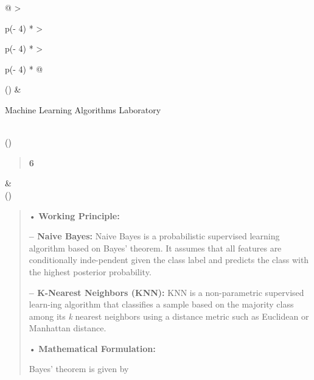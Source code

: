 \documentclass[
]{article}
\begin{document}
\begin{longtable}[]{@{}
  >{\raggedright\arraybackslash}p{(\columnwidth - 4\tabcolsep) * }
  >{\raggedright\arraybackslash}p{(\columnwidth - 4\tabcolsep) * }
  >{\raggedright\arraybackslash}p{(\columnwidth - 4\tabcolsep) * }@{}}
\toprule()
 & \begin{minipage}[b]{\linewidth}\raggedright
Machine Learning Algorithms Laboratory
\end{minipage} \\
\midrule()
\endhead
\begin{minipage}[t]{\linewidth}\raggedright
\begin{quote}
\textbf{6}
\end{quote}
\end{minipage} &
 \\
\bottomrule()
\end{longtable}

\begin{quote}
• \textbf{Working Principle:}

\textbf{-- Naive Bayes:} Naive Bayes is a probabilistic supervised
learning algorithm based on Bayes' theorem. It assumes that all features
are conditionally inde-pendent given the class label and predicts the
class with the highest posterior probability.

\textbf{-- K-Nearest Neighbors (KNN):} KNN is a non-parametric
supervised learn-ing algorithm that classifies a sample based on the
majority class among its \emph{k} nearest neighbors using a distance
metric such as Euclidean or Manhattan distance.

• \textbf{Mathematical Formulation:}

Bayes' theorem is given by
\end{quote}
\end{document}
